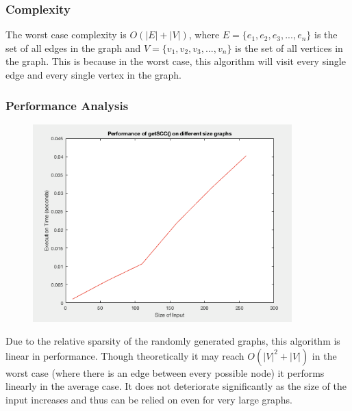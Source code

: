 \documentclass[11pt]{article}
\begin{document}
	\subsubsection{Complexity}
	The worst case complexity is \(O(|E| + |V|)\), where \(E = \{e_1,e_2,e_3,...,e_n\}\) is the set of all edges in the graph and \(V = \{v_1,v_2,v_3,...,v_n\}\) is the set of all vertices in the graph. This is because in the worst case, this algorithm will visit every single edge and every single vertex in the graph.
	\subsubsection{Performance Analysis}
	\begin{figure}[h!]
		\centering
		\includegraphics[width=100mm,scale=0.5]{images/strongconnect.png}
	\end{figure}
	Due to the relative sparsity of the randomly generated graphs, this algorithm is linear in performance. Though theoretically it may reach \(O(|V|^2 + |V|)\) in the worst case (where there is an edge between every possible node) it performs linearly in the average case. It does not deteriorate significantly as the size of the input increases and thus can be relied on even for very large graphs.
\end{document}
